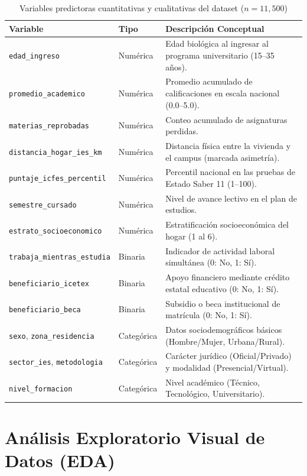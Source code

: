\documentclass[12pt,a4paper]{article}
\begin{document}
\begin{table}[htbp]
\centering
\caption{Variables predictoras cuantitativas y cualitativas del dataset ($n=11,500$)}
\label{tab:variables_resumen}
\small
\begin{tabularx}{\textwidth}{l l X}
\toprule
\textbf{Variable} & \textbf{Tipo} & \textbf{Descripción Conceptual} \\
\midrule
\texttt{edad\_ingreso} & Numérica & Edad biológica al ingresar al programa universitario (15--35 años). \\
\texttt{promedio\_academico} & Numérica & Promedio acumulado de calificaciones en escala nacional (0.0--5.0). \\
\texttt{materias\_reprobadas} & Numérica & Conteo acumulado de asignaturas perdidas. \\
\texttt{distancia\_hogar\_ies\_km} & Numérica & Distancia física entre la vivienda y el campus (marcada asimetría). \\
\texttt{puntaje\_icfes\_percentil} & Numérica & Percentil nacional en las pruebas de Estado Saber 11 (1--100). \\
\texttt{semestre\_cursado} & Numérica & Nivel de avance lectivo en el plan de estudios. \\
\texttt{estrato\_socioeconomico} & Numérica & Estratificación socioeconómica del hogar (1 al 6). \\
\texttt{trabaja\_mientras\_estudia} & Binaria & Indicador de actividad laboral simultánea (0: No, 1: Sí). \\
\texttt{beneficiario\_icetex} & Binaria & Apoyo financiero mediante crédito estatal educativo (0: No, 1: Sí). \\
\texttt{beneficiario\_beca} & Binaria & Subsidio o beca institucional de matrícula (0: No, 1: Sí). \\
\texttt{sexo}, \texttt{zona\_residencia} & Categórica & Datos sociodemográficos básicos (Hombre/Mujer, Urbana/Rural). \\
\texttt{sector\_ies}, \texttt{metodologia} & Categórica & Carácter jurídico (Oficial/Privado) y modalidad (Presencial/Virtual). \\
\texttt{nivel\_formacion} & Categórica & Nivel académico (Técnico, Tecnológico, Universitario). \\
\bottomrule
\end{tabularx}
\end{table}

\section{Análisis Exploratorio Visual de Datos (EDA)}
\end{document}
